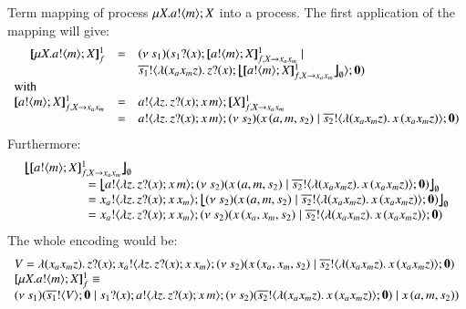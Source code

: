 \begin{example}

 Term mapping of \HOp process $\mu X. a ! \langle m \rangle ; X$
into a \HO process. The first application of the mapping
will give:
%
\[
\begin{array}{rcl}
	\pmapp{\recp{X}{\bout{a}{m} \varp{X}}}{1}{f} &=&
	\newsp{s_1}{ \binp{s_1}{x} \pmapp{\bout{a}{m} \varp{X}}{1}{f, \varp{X} \rightarrow x_ax_m} \Par\\
	&&\bout{\dual{s_1}}{ \abs{(x_a x_m z)} \binp{z}{x} \auxmap{\pmapp{\bout{a}{m} \varp{X}}{1}{f, \varp{X} \rightarrow x_ax_m}}{\es} } \inact}
	\\
	\multicolumn{3}{l}{\textrm{with}}
	\\
	\pmapp{\bout{a}{m} \varp{X}}{1}{f, \varp{X} \rightarrow x_ax_m} &=&
	\bout{a}{\abs{z}{\binp{z}{x} \appl{x}{m}}} \pmapp{\varp{X}}{1}{f, \varp{X} \rightarrow x_ax_m}
	\\
	&=& \bout{a}{\abs{z}{\binp{z}{x} \appl{x}{m}}} \newsp{s_2}{\appl{x}{(a,m, s_2)}  \Par \bout{\dual{s_2}}{\abs{(x_a x_m z)}{\appl{x}{(x_a x_m z)}}} \inact}
\end{array}
\]
%
\noi Furthermore:
%
\[
\begin{array}{l}
	\auxmap{\pmapp{\bout{a}{m} \varp{X}}{1}{f, \varp{X} \rightarrow x_ax_m}}{\es}\\
	\qquad \qquad \quad = \auxmap{\bout{a}{\abs{z}{\binp{z}{x} \appl{x}{m}}} \newsp{s_2}{\appl{x}{(a,m, s_2)}  \Par \bout{\dual{s_2}}{\abs{(x_a x_m z)}{\appl{x}{(x_a x_m z)}}} \inact}}{\es}
	\\
	\qquad \qquad \quad = \bout{x_a}{\abs{z}{\binp{z}{x} \appl{x}{x_m}}} \auxmap{\newsp{s_2}{\appl{x}{(a,m, s_2)}  \Par \bout{\dual{s_2}}{\abs{(x_a x_m z)}{\appl{x}{(x_a x_m z)}}} \inact}}{\es}
	\\
	\qquad \qquad \quad = \bout{x_a}{\abs{z}{\binp{z}{x} \appl{x}{x_m}}} \newsp{s_2}{\appl{x}{(x_a,x_m, s_2)}  \Par \bout{\dual{s_2}}{\abs{(x_a x_m z)}{\appl{x}{(x_a x_m z)}}} \inact}
\end{array}
\]
%
\noi The whole encoding would be:
%
\[
\begin{array}{l}
	V = \abs{(x_a x_m z)} \binp{z}{x} \bout{x_a}{\abs{z}{\binp{z}{x} \appl{x}{x_m}}} \newsp{s_2}{\appl{x}{(x_a,x_m, s_2)}  \Par \bout{\dual{s_2}}{\abs{(x_a x_m z)}{\appl{x}{(x_a x_m z)}}} \inact}\\
	\pmapp{\recp{X}{\bout{a}{m} \varp{X}}}{1}{f} \scong \\
	\newsp{s_1}{\bout{\dual{s_1}}{V} \inact \Par \binp{s_1}{x} \bout{a}{\abs{z}{\binp{z}{x} \appl{x}{m}}} \newsp{s_2}{\bout{\dual{s_2}}{\abs{(x_a x_m z)}{\appl{x}{(x_a x_m z)}}} \inact} \Par \appl{x}{(a,m, s_2)}}
\end{array}
\]


\end{example}

